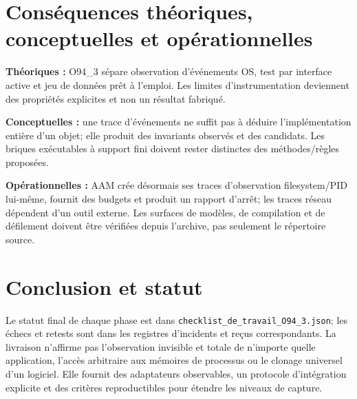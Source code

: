 \documentclass[11pt,a4paper]{article}
\begin{document}
\section{Conséquences théoriques, conceptuelles et opérationnelles}
\textbf{Théoriques :} O94\_3 sépare observation d'événements OS, test par interface active et jeu de données prêt à l'emploi. Les limites d'instrumentation deviennent des propriétés explicites et non un résultat fabriqué.

\textbf{Conceptuelles :} une trace d'événements ne suffit pas à déduire l'implémentation entière d'un objet; elle produit des invariants observés et des candidats. Les briques exécutables à support fini doivent rester distinctes des méthodes/règles proposées.

\textbf{Opérationnelles :} AAM crée désormais ses traces d'observation filesystem/PID lui-même, fournit des budgets et produit un rapport d'arrêt; les traces réseau dépendent d'un outil externe. Les surfaces de modèles, de compilation et de défilement doivent être vérifiées depuis l'archive, pas seulement le répertoire source.

\section{Conclusion et statut}
Le statut final de chaque phase est dans \texttt{checklist\_de\_travail\_O94\_3.json}; les échecs et retests sont dans les registres d'incidents et reçus correspondants. La livraison n'affirme pas l'observation invisible et totale de n'importe quelle application, l'accès arbitraire aux mémoires de processus ou le clonage universel d'un logiciel. Elle fournit des adaptateurs observables, un protocole d'intégration explicite et des critères reproductibles pour étendre les niveaux de capture.
\end{document}
